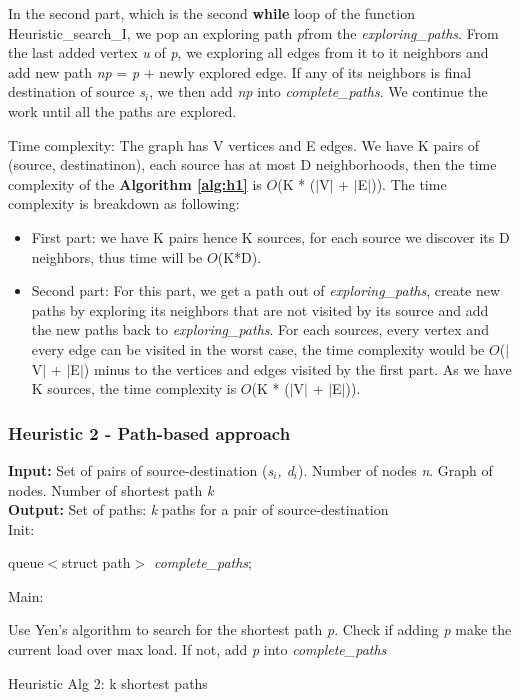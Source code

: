 In the second part, which is the second \textbf{while} loop of the function Heuristic\_search\_I, we pop an exploring path \textit{p}from the \textit{exploring\_paths}. From the last added vertex \textit{u} of \textit{p}, we exploring all edges from it to it neighbors and add new path \textit{np} = \textit{p} + newly explored edge. If any of its neighbors is final destination of source \textit{s$_i$}, we then add \textit{np} into \textit{complete\_paths}. We continue the work until all the paths are explored.

Time complexity: The graph has V vertices and E edges. We have K pairs of (source, destinatinon), each source has at most D neighborhoods, then the time complexity of the \textbf{Algorithm \ref{alg:h1}} is $O$(K * ($|$V$|$ + $|$E$|$)). The time complexity is breakdown as following:
\begin{itemize}
\item First part: we have K pairs hence K sources, for each source we discover its D neighbors, thus time will be $O$(K*D).
\item Second part: For this part, we get a path out of \textit{exploring\_paths}, create new paths by exploring its neighbors that are not visited by its source and add the new paths back to \textit{exploring\_paths}. For each sources, every vertex and every edge can be visited in the worst case, the time complexity would be $O$($|$V$|$ + $|$E$|$) minus to the vertices and edges visited by the first part. As we have K sources, the time complexity is $O$(K * ($|$V$|$ + $|$E$|$)).
\end{itemize}

\subsubsection{Heuristic 2 - Path-based approach}

\begin{algorithm}[!htp]
\textbf{Input:} Set of pairs of source-destination (\textit{s$_i$, d$_i$}). Number of nodes \textit{n}. Graph of nodes. Number of shortest path \textit{k}\\
\textbf{Output:} Set of paths: \textit{k} paths for a pair of source-destination\\
Init:
    \begin{algorithmic}
        \State queue$<$struct path$>$ \textit{complete\_paths};
    \end{algorithmic}
Main:
\begin{algorithmic}
		\State Use Yen's algorithm to search for the shortest path \textit{p}.
		\State Check if adding \textit{p} make the current load over max load.
		\State If not, add \textit{p} into \textit{complete\_paths}
	    \EndWhile
	\EndFor
    \EndFunction
\end{algorithmic}

\caption{Heuristic Alg 2: k shortest paths}
\label{alg:h2}

\end{algorithm}

